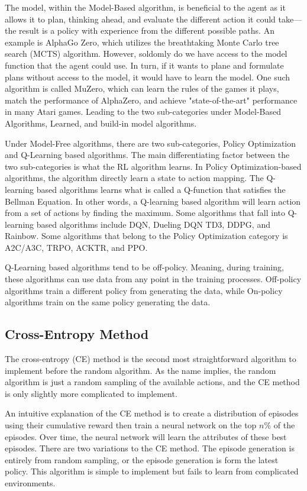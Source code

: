 The model, within the Model-Based algorithm, is beneficial to the agent as it allows it to plan, thinking ahead, and evaluate the different action it could take—the result is a policy with experience from the different possible paths. An example is AlphaGo Zero, which utilizes the breathtaking Monte Carlo tree search (MCTS) algorithm. However, soldomly do we have access to the model function that the agent could use. In turn, if it wants to plane and formulate plans without access to the model, it would have to learn the model. One such algorithm is called MuZero, which can learn the rules of the games it plays, match the performance of AlphaZero, and achieve "state-of-the-art" performance in many Atari games. Leading to the two sub-categories under Model-Based Algorithms, Learned, and build-in model algorithms.

Under Model-Free algorithms, there are two sub-categories, Policy Optimization and Q-Learning based algorithms. The main differentiating factor between the two sub-categories is what the RL algorithm learns. In Policy Optimization-based algorithms, the algorithm directly learn a state to action mapping. The Q-learning based algorithms learns what is called a Q-function that satisfies the Bellman Equation. In other words, a Q-learning based algorithm will learn action from a set of actions by finding the maximum. Some algorithms that fall into Q-learning based algorithms include DQN, Dueling DQN TD3, DDPG, and Rainbow. Some algorithms that belong to the Policy Optimization category is A2C/A3C, TRPO, ACKTR, and PPO. 

Q-Learning based algorithms tend to be off-policy. Meaning, during training, these algorithms can use data from any point in the training processes. Off-policy algorithms train a different policy from generating the data, while On-policy algorithms train on the same policy generating the data.

\subsection{Cross-Entropy Method}

The cross-entropy (CE) method is the second most straightforward algorithm to implement before the random algorithm. As the name implies, the random algorithm is just a random sampling of the available actions, and the CE method is only slightly more complicated to implement.

An intuitive explanation of the CE method is to create a distribution of episodes using their cumulative reward then train a neural network on the top $n$\% of the episodes. Over time, the neural network will learn the attributes of these best episodes. There are two variations to the CE method. The episode generation is entirely from random sampling, or the episode generation is form the latest policy. This algorithm is simple to implement but fails to learn from complicated environments. 

